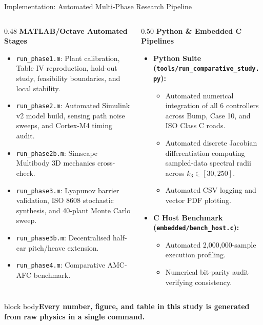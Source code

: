 \documentclass[aspectratio=169,10pt]{beamer}
\newcommand{\takeaway}[1]{\vfill\begin{beamercolorbox}[wd=\linewidth,sep=1ex]{block body}\color{accent}\bfseries #1\end{beamercolorbox}}
\begin{document}
\begin{frame}{Implementation: Automated Multi-Phase Research Pipeline}
\begin{columns}[T]
\begin{column}{0.48\linewidth}
{\color{accent}\bfseries MATLAB/Octave Automated Stages}
\begin{itemize}\itemsep1pt\scriptsize
\item \texttt{run\_phase1.m}: Plant calibration, Table IV reproduction, hold-out study, feasibility boundaries, and local stability.
\item \texttt{run\_phase2.m}: Automated Simulink v2 model build, sensing path noise sweeps, and Cortex-M4 timing audit.
\item \texttt{run\_phase2b.m}: Simscape Multibody 3D mechanics cross-check.
\item \texttt{run\_phase3.m}: Lyapunov barrier validation, ISO 8608 stochastic synthesis, and 40-plant Monte Carlo sweep.
\item \texttt{run\_phase3b.m}: Decentralised half-car pitch/heave extension.
\item \texttt{run\_phase4.m}: Comparative AMC-AFC benchmark.
\end{itemize}
\end{column}
\begin{column}{0.50\linewidth}
{\color{accent}\bfseries Python \& Embedded C Pipelines}
\begin{itemize}\itemsep1pt\scriptsize
\item \textbf{Python Suite (\texttt{tools/run\_comparative\_study.py}):}
\begin{itemize}\itemsep0.5pt
\item Automated numerical integration of all 6 controllers across Bump, Case 10, and ISO Class C roads.
\item Automated discrete Jacobian differentiation computing sampled-data spectral radii across $k_3 \in [30, 250]$.
\item Automated CSV logging and vector PDF plotting.
\end{itemize}
\item \textbf{C Host Benchmark (\texttt{embedded/bench\_host.c}):}
\begin{itemize}\itemsep0.5pt
\item Automated 2,000,000-sample execution profiling.
\item Numerical bit-parity audit verifying consistency.
\end{itemize}
\end{itemize}
\end{column}
\end{columns}
\par\vspace{0.05cm}
\takeaway{Every number, figure, and table in this study is generated from raw physics in a single command.}
\end{frame}
\end{document}
